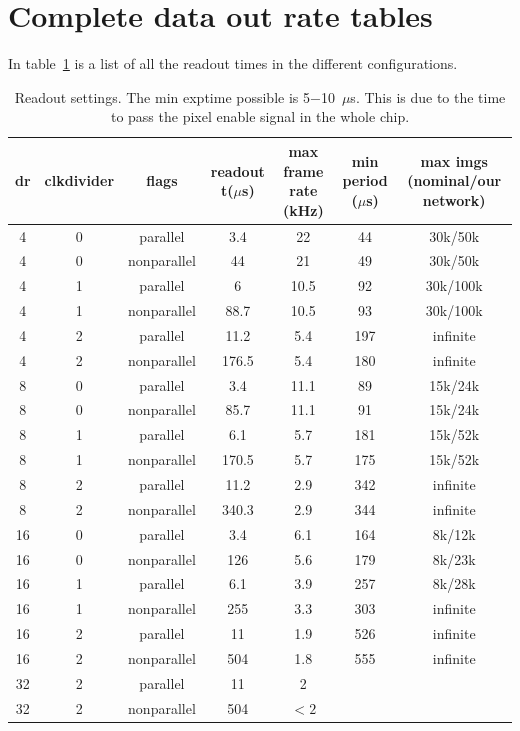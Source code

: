 \documentclass{article}
\begin{document}
{{{\begin{enumerate}
\end{enumerate}

\section{Complete data out rate tables}

In table~\ref{tframescomplete} is a list of all the readout times in the different configurations.
\begin{tiny}
\begin{table}
\begin{flushleft}
\begin{tabular}{|c|c|c|c|c|c|c|}
\hline
\tiny{dr} & \tiny{clkdivider} & \tiny{flags} & \tiny{readout t($\mu$s)} & \tiny{max frame rate (kHz)} & \tiny{min period ($\mu$s)} & \tiny{max imgs (nominal/our network)}\\
\hline
4 & 0 & parallel & 3.4 & 22 &  44 & 30k/50k\\
\hline
4 & 0 & nonparallel & 44 & 21 & 49 & 30k/50k\\
\hline
4 & 1 & parallel & 6 & 10.5 &  92 & 30k/100k\\
\hline
4 & 1 & nonparallel & 88.7 & 10.5 & 93 & 30k/100k\\
\hline
4 & 2 & parallel & 11.2 & 5.4 & 197 & infinite\\
\hline
4 & 2 & nonparallel & 176.5 & 5.4 & 180 & infinite\\
\hline
\hline
8 & 0 & parallel & 3.4 & 11.1 & 89 & 15k/24k\\
\hline
8 & 0 & nonparallel & 85.7 & 11.1 & 91 & 15k/24k\\
\hline
8 & 1 & parallel & 6.1 & 5.7 & 181 & 15k/52k\\
\hline
8 & 1 & nonparallel & 170.5 & 5.7 & 175 & 15k/52k\\
\hline
8 & 2 & parallel & 11.2 &  2.9 &  342 & infinite\\
\hline
8 & 2 & nonparallel & 340.3 &  2.9 &  344 & infinite\\
\hline
\hline
16 & 0 & parallel & 3.4 & 6.1 & 164 & 8k/12k\\
\hline
16 & 0 & nonparallel &  126 & 5.6& 179 & 8k/23k\\
\hline
16 & 1 & parallel &  6.1 & 3.9&  257 & 8k/28k\\
\hline
16 & 1 & nonparallel & 255 & 3.3&  303 & infinite\\
\hline
16 & 2 & parallel &  11 & 1.9  & 526 &infinite \\
\hline
16 & 2 & nonparallel & 504 & 1.8 & 555 & infinite\\
\hline
\hline
32 & 2 & parallel &  11 & 2  & &\\
\hline
32 & 2 & nonparallel & 504 & $<2$  & &\\
\hline
\end{tabular}
\caption{Readout settings. The {\tiny{min exptime}} possible is 5$-$10~$\mu$s. This is due to the time to pass the pixel enable signal in the whole chip.}
\label{tframescomplete}
\end{flushleft}
\end{table}
\end{tiny}

}}}
\end{document}
